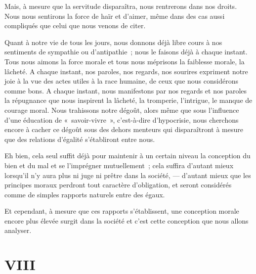 \documentclass[french,twoside]{book} %
\begin{document}
Mais, à mesure que la servitude disparaîtra, nous rentrerons dans nos droits. Nous nous sentirons la force de haïr et d’aimer, même dans des cas aussi compliqués que celui que nous venons de citer.\par
\bigbreak
\noindent Quant à notre vie de tous les jours, nous donnons déjà libre cours à nos sentiments de sympathie ou d’antipathie ; nous le faisons déjà à chaque instant. Tous nous aimons la force morale et tous nous méprisons la faiblesse morale, la lâcheté. A chaque instant, nos paroles, nos regards, nos sourires expriment notre joie à la vue des actes utiles à la race humaine, de ceux que nous considérons comme bons. A chaque instant, nous manifestons par nos regards et nos paroles la répugnance que nous inspirent la lâcheté, la tromperie, l’intrigue, le manque de courage moral. Nous trahissons notre dégoût, alors même que sous l’influence d’une éducation de « savoir-vivre », c’est-à-dire d’hypocrisie, nous cherchons encore à cacher ce dégoût sous des dehors menteurs qui disparaîtront à mesure que des relations d’égalité s’établiront entre nous.\par
\bigbreak
\noindent Eh bien, cela seul suffit déjà pour maintenir à un certain niveau la conception du bien et du mal et se l’imprégner mutuellement ; cela suffira d’autant mieux lorsqu’il n’y aura plus ni juge ni prêtre dans la société, — d’autant mieux que les principes moraux perdront tout caractère d’obligation, et seront considérés comme de simples rapports naturels entre des égaux.\par
Et cependant, à mesure que ces rapports s’établissent, une conception morale encore plus élevée surgit dans la société et c’est cette conception que nous allons analyser.
\section[{VIII}]{VIII}
\label{p08}\renewcommand{\leftmark}{VIII}
\end{document}

